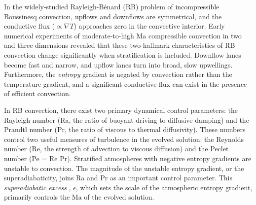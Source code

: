 \documentclass[aps, prl, twocolumn, nofootinbib, groupedaddress, amsfonts, amssymb, amsmath]{revtex4-1}
\newcommand{\grad}{\ensuremath{\nabla}}
\newcommand{\RB}{Rayleigh-B\'{e}nard }
\begin{document}

In the widely-studied \RB (RB) problem of incompressible Boussinesq convection, 
upflows and downflows are symmetrical, and
the conductive flux ($\propto \grad T$) approaches 
zero in the convective interior.
Early numerical experiments of moderate-to-high Ma compressible convection
in two \cite{graham1975, chan&all1982,
hurlburt&all1984, cattaneo&all1990} and three 
\cite{cattaneo&all1991, brummell&all1996} dimensions
revealed that these two hallmark characteristics of RB convection change
significantly when stratification is included.  Downflow lanes
become fast and narrow, and upflow lanes turn into broad, slow upwellings.
Furthermore, the \emph{entropy} gradient is negated by convection 
rather than the temperature gradient, and
a significant conductive flux can exist in the presence of
efficient convection.

In RB convection, there exist two primary dynamical control parameters: 
the Rayleigh number (Ra, the ratio of
buoyant driving to diffusive damping) and the Prandtl number 
(Pr, the ratio of viscous to thermal
diffusivity). These numbers control two useful
measures of turbulence in the evolved solution:
the Reynolds
number (Re, the strength of advection to viscous diffusion)
and the Peclet number (Pe = Re Pr).  Stratified atmospheres
with negative entropy gradients are unstable to convection.
The magnitude of the unstable entropy gradient, or the superadiabaticity,
joins Ra and Pr as an important control parameter.  This 
\emph{superadiabatic excess} \cite{graham1975}, $\epsilon$, which 
sets the scale of the atmospheric entropy gradient,
primarily controls the Ma of the evolved solution.
\end{document}
